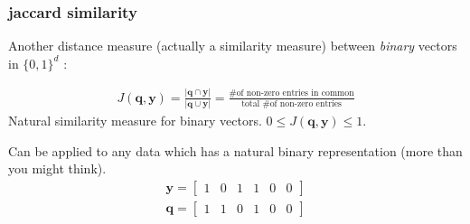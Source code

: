 \documentclass[compress]{beamer}
\newcommand{\bv}[1]{\mathbf{#1}}
\begin{document}
\begin{frame}
	\frametitle{jaccard similarity}
	Another distance measure (actually a similarity measure) between \emph{binary} vectors in $\{0,1\}^d$ :
	\begin{definition}
		\begin{align*}
			J(\bv{q},\bv{y}) = \frac{|\bv{q} \cap \bv{y}|}{|\bv{q} \cup \bv{y}|} = \frac{\text{\# of non-zero entries in common}}{\text{total \# of non-zero entries}}
		\end{align*}
		Natural similarity measure for binary vectors. $0\leq J(\bv{q},\bv{y})\leq 1$.
	\end{definition}
	
	Can be applied to any data which has a natural binary representation (more than you might think). 
	\begin{align*}
		\bv{y} = \begin{bmatrix}1 & 0 & 1 & 1 & 0 & 0\end{bmatrix}\\
		\bv{q} = \begin{bmatrix}1 & 1 & 0 & 1 & 0 & 0\end{bmatrix}
	\end{align*}
\end{frame}
\end{document}
